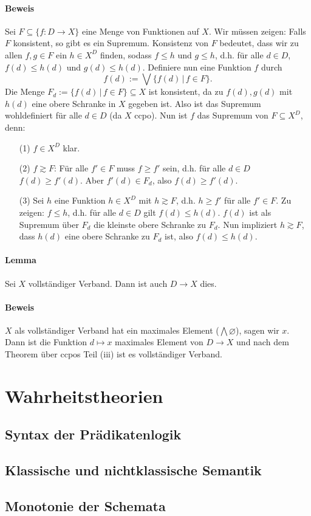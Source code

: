 \documentclass[a4paper,11pt,abstracton]{scrartcl}
\begin{document}
\paragraph{Beweis} Sei $F \subseteq \{ f \colon D \to X\}$ eine Menge von Funktionen auf $X$. Wir müssen zeigen: Falls $F$ konsistent, so gibt es ein Supremum. Konsistenz von $F$ bedeutet, dass wir zu allen $f,g\in F$ ein $h \in X^D$ finden, sodass $f \leq h$ und $g \leq h$, d.h. für alle $d \in D$, $f(d) \leq h(d)$ und $g(d) \leq h(d)$. Definiere nun eine Funktion $f$ durch
\begin{equation}
 f(d) := \bigvee \{ f(d) \, | \, f \in F \}.
\end{equation}
Die Menge $F_d := \{ f(d) \, | \, f \in F \} \subseteq X$ ist konsistent, da zu $f(d), g(d)$ mit $h(d)$ eine obere Schranke in $X$ gegeben ist. Also ist das Supremum wohldefiniert für alle $d \in D$ (da $X$ ccpo). Nun ist $f$ das Supremum von $F \subseteq X^D$, denn:
\begin{enumerate}
 \item[(1)] $f \in X^D$ klar.
 \item[(2)] $f \gtrsim F$: Für alle $f' \in F$ muss $f \geq f'$ sein, d.h. für alle $d \in D$ $f(d) \geq f'(d)$. Aber $f'(d) \in F_d$, also $f(d) \geq f'(d)$.
 \item[(3)] Sei $h$ eine Funktion $h \in X^D$ mit $h \gtrsim F$, d.h. $h \geq f'$ für alle $f' \in F$. Zu zeigen: $f \leq h$, d.h. für alle $d\in D$ gilt $f(d) \leq h(d)$. $f(d)$ ist als Supremum über $F_d$ die kleinste obere Schranke zu $F_d$. Nun impliziert $h \gtrsim F$, dass $h(d)$ eine obere Schranke zu $F_d$ ist, also $ f(d) \leq h(d)$.
\end{enumerate}
\paragraph{Lemma} Sei $X$ vollständiger Verband. Dann ist auch $D \to X$ dies.
\paragraph{Beweis} $X$ als vollständiger Verband hat ein maximales Element ($\bigwedge \varnothing$), sagen wir $x$. Dann ist die Funktion $d \mapsto x$ maximales Element von $D \to X$ und nach dem Theorem über ccpos Teil (iii) ist es vollständiger Verband.


\section{Wahrheitstheorien}
\subsection{Syntax der Prädikatenlogik}
\subsection{Klassische und nichtklassische Semantik}
\subsection{Monotonie der Schemata}
\end{document}

